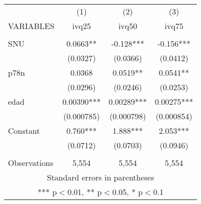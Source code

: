 \begin{tabular}{lccc} \hline
 & (1) & (2) & (3) \\
VARIABLES & ivq25 & ivq50 & ivq75 \\ \hline
 &  &  &  \\
SNU & 0.0663** & -0.128*** & -0.156*** \\
 & (0.0327) & (0.0366) & (0.0412) \\
p78n & 0.0368 & 0.0519** & 0.0541** \\
 & (0.0296) & (0.0246) & (0.0253) \\
edad & 0.00390*** & 0.00289*** & 0.00275*** \\
 & (0.000785) & (0.000798) & (0.000854) \\
Constant & 0.760*** & 1.888*** & 2.053*** \\
 & (0.0712) & (0.0703) & (0.0946) \\
 &  &  &  \\
 Observations & 5,554 & 5,554 & 5,554 \\ \hline
\multicolumn{4}{c}{ Standard errors in parentheses} \\
\multicolumn{4}{c}{ *** p$<$0.01, ** p$<$0.05, * p$<$0.1} \\
\end{tabular}
